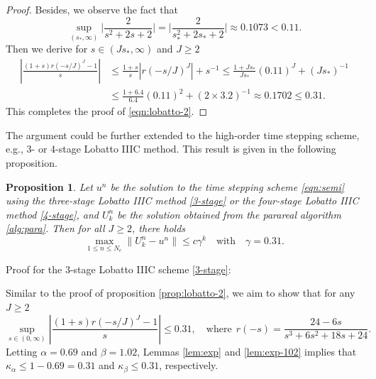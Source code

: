 \documentclass[a4paper, oneside]{book}
\newtheorem{proposition}{Proposition}[section]
\begin{document}
\begin{proof}
Besides, we observe the fact that
$$\sup\limits_{(s_*, \infty)}
\Big|\frac{2}{s^2 + 2s + 2}\Big|
= \Big|\frac{2}{s_*^2 + 2s_* + 2}\Big|
\approx 0.1073 < 0.11.$$
Then we derive for $s\in (Js_*,\infty)$ and $J\ge 2$
\begin{equation*}
\begin{split}
    \left|\frac{(1+s) r(-s/J)^J-1}{s}\right|
    &\le \frac{1+s}{s}|r(-s/J)^J|+s^{-1}
    \le \frac{1+Js_*}{Js_*} (0.11)^J + (Js_*)^{-1}    \\
    &\le  \frac{1+6.4}{6.4} (0.11)^2 + (2\times 3.2)^{-1}
    \approx 0.1702 \le 0.31.
\end{split}
\end{equation*}
This completes the proof of \eqref{eqn:lobatto-2}.
\end{proof}

The argument could be further extended to the high-order time stepping scheme, e.g., 3- or 4-stage Lobatto IIIC method.
This result is given in the following proposition.

\begin{proposition}\label{prop:lobatto-34}
Let $u^n$ be the solution to the time stepping scheme
\eqref{eqn:semi} using
the three-stage Lobatto IIIC method \eqref{3-stage} or the four-stage Lobatto IIIC method \eqref{4-stage},
and $U_k^n$ be the solution obtained from the parareal algorithm \ref{alg:para}. Then for all $J \ge 2$, there holds
$$ \max_{1 \le n\le N_c} \| U_k^n - u^n \|  \le c \gamma^k\quad \text{with} \quad \gamma=0.31.$$
\end{proposition}

Proof for the 3-stage Lobatto IIIC scheme \eqref{3-stage}: 


Similar to the proof of proposition \ref{prop:lobatto-2}, we aim to show that for any $J\ge 2$
\begin{equation}\label{eqn:lobatto-3}
    \sup_{s\in(0,\infty)}  \left|\frac{(1+s) r(-s/J)^J-1}{s}\right| \le 0.31,
    \quad
    \text{where}~~ r(-s) = \frac{24-6s}{s^3 + 6s^2 + 18s + 24}.
\end{equation}
Letting $\alpha = 0.69$ and $\beta=1.02$,
Lemmas \ref{lem:exp} and \ref{lem:exp-102} implies that
$\kappa_\alpha \le 1-0.69 = 0.31$ and $\kappa_\beta \le 0.31$, respectively.
\end{document}
